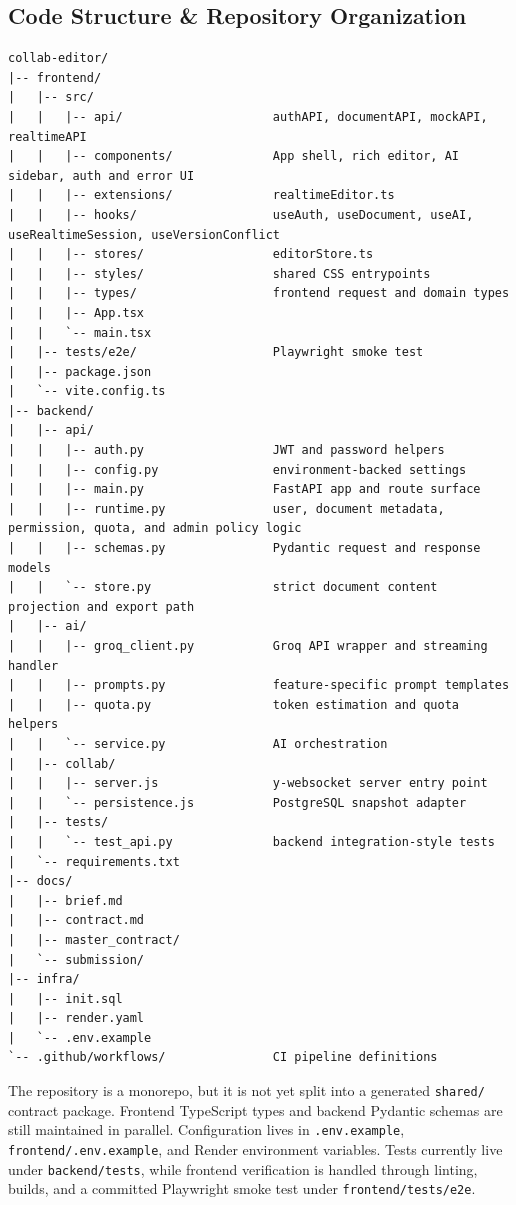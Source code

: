 \documentclass{article}
\begin{document}
\subsection{Code Structure \& Repository Organization}
\begin{footnotesize}
\begin{verbatim}
collab-editor/
|-- frontend/
|   |-- src/
|   |   |-- api/                     authAPI, documentAPI, mockAPI, realtimeAPI
|   |   |-- components/              App shell, rich editor, AI sidebar, auth and error UI
|   |   |-- extensions/              realtimeEditor.ts
|   |   |-- hooks/                   useAuth, useDocument, useAI, useRealtimeSession, useVersionConflict
|   |   |-- stores/                  editorStore.ts
|   |   |-- styles/                  shared CSS entrypoints
|   |   |-- types/                   frontend request and domain types
|   |   |-- App.tsx
|   |   `-- main.tsx
|   |-- tests/e2e/                   Playwright smoke test
|   |-- package.json
|   `-- vite.config.ts
|-- backend/
|   |-- api/
|   |   |-- auth.py                  JWT and password helpers
|   |   |-- config.py                environment-backed settings
|   |   |-- main.py                  FastAPI app and route surface
|   |   |-- runtime.py               user, document metadata, permission, quota, and admin policy logic
|   |   |-- schemas.py               Pydantic request and response models
|   |   `-- store.py                 strict document content projection and export path
|   |-- ai/
|   |   |-- groq_client.py           Groq API wrapper and streaming handler
|   |   |-- prompts.py               feature-specific prompt templates
|   |   |-- quota.py                 token estimation and quota helpers
|   |   `-- service.py               AI orchestration
|   |-- collab/
|   |   |-- server.js                y-websocket server entry point
|   |   `-- persistence.js           PostgreSQL snapshot adapter
|   |-- tests/
|   |   `-- test_api.py              backend integration-style tests
|   `-- requirements.txt
|-- docs/
|   |-- brief.md
|   |-- contract.md
|   |-- master_contract/
|   `-- submission/
|-- infra/
|   |-- init.sql
|   |-- render.yaml
|   `-- .env.example
`-- .github/workflows/               CI pipeline definitions
\end{verbatim}
\end{footnotesize}

\noindent The repository is a monorepo, but it is not yet split into a generated \texttt{shared/} contract package. Frontend TypeScript types and backend Pydantic schemas are still maintained in parallel. Configuration lives in \texttt{.env.example}, \texttt{frontend/.env.example}, and Render environment variables. Tests currently live under \texttt{backend/tests}, while frontend verification is handled through linting, builds, and a committed Playwright smoke test under \texttt{frontend/tests/e2e}.
\end{document}
